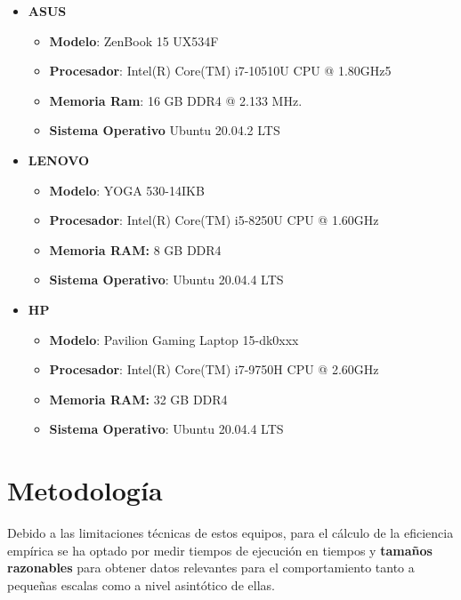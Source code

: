 \documentclass{homework}
\begin{document}
    \begin{itemize}
        \item \textbf{ASUS} 
        \begin{itemize}
            \item \textbf{Modelo}: ZenBook 15 UX534F
            \item \textbf{Procesador}: Intel(R) Core(TM) i7-10510U CPU @ 1.80GHz5
            \item \textbf{Memoria Ram}: 16 GB DDR4 @ 2.133 MHz.
            \item \textbf{Sistema Operativo} Ubuntu 20.04.2 LTS
        \end{itemize}
        
        \item \textbf{LENOVO}
        \begin{itemize}
            \item \textbf{Modelo}: YOGA 530-14IKB
            \item \textbf{Procesador}: Intel(R) Core(TM) i5-8250U CPU @ 1.60GHz
            \item \textbf{Memoria RAM:} 8 GB DDR4
            \item \textbf{Sistema Operativo}: Ubuntu 20.04.4 LTS
        \end{itemize}
        
        \item \textbf{HP}
        \begin{itemize}
            \item \textbf{Modelo}: Pavilion Gaming Laptop 15-dk0xxx
            \item \textbf{Procesador}: Intel(R) Core(TM) i7-9750H CPU @ 2.60GHz
            \item \textbf{Memoria RAM:} 32 GB DDR4
            \item \textbf{Sistema Operativo}: Ubuntu 20.04.4 LTS
        \end{itemize}
    \end{itemize}
    
    \newpage
    \section{Metodología}

    Debido a las limitaciones técnicas de estos equipos, para el cálculo de la eficiencia empírica se ha 
    optado por medir tiempos de ejecución en tiempos y \textbf{tamaños razonables} para obtener datos relevantes
    para el comportamiento tanto a pequeñas escalas como a nivel asintótico de ellas. 
\end{document}
